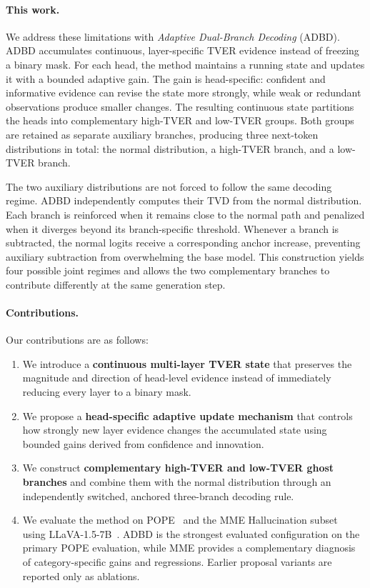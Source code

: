 \paragraph{This work.}
We address these limitations with \emph{Adaptive Dual-Branch Decoding} (ADBD). ADBD accumulates continuous, layer-specific TVER evidence instead of freezing a binary mask. For each head, the method maintains a running state and updates it with a bounded adaptive gain. The gain is head-specific: confident and informative evidence can revise the state more strongly, while weak or redundant observations produce smaller changes. The resulting continuous state partitions the heads into complementary high-TVER and low-TVER groups. Both groups are retained as separate auxiliary branches, producing three next-token distributions in total: the normal distribution, a high-TVER branch, and a low-TVER branch.

The two auxiliary distributions are not forced to follow the same decoding regime. ADBD independently computes their TVD from the normal distribution. Each branch is reinforced when it remains close to the normal path and penalized when it diverges beyond its branch-specific threshold. Whenever a branch is subtracted, the normal logits receive a corresponding anchor increase, preventing auxiliary subtraction from overwhelming the base model. This construction yields four possible joint regimes and allows the two complementary branches to contribute differently at the same generation step.

\paragraph{Contributions.}
Our contributions are as follows:
\begin{enumerate}
    \item We introduce a \textbf{continuous multi-layer TVER state} that preserves the magnitude and direction of head-level evidence instead of immediately reducing every layer to a binary mask.
    \item We propose a \textbf{head-specific adaptive update mechanism} that controls how strongly new layer evidence changes the accumulated state using bounded gains derived from confidence and innovation.
    \item We construct \textbf{complementary high-TVER and low-TVER ghost branches} and combine them with the normal distribution through an independently switched, anchored three-branch decoding rule.
    \item We evaluate the method on POPE~\cite{li2023pope} and the MME Hallucination subset~\cite{fu2023mme} using LLaVA-1.5-7B~\cite{liu2024visual}. ADBD is the strongest evaluated configuration on the primary POPE evaluation, while MME provides a complementary diagnosis of category-specific gains and regressions. Earlier proposal variants are reported only as ablations.
\end{enumerate}

